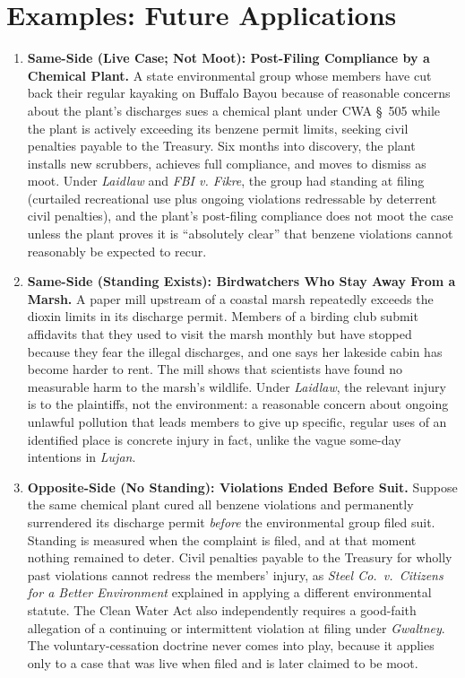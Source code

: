\documentclass[12pt]{article}
\begin{document}
\section{Examples: Future Applications}
\begin{enumerate}

\item \textbf{Same-Side (Live Case; Not Moot): Post-Filing Compliance by a Chemical Plant.} A state environmental group whose members have cut back their regular kayaking on Buffalo Bayou because of reasonable concerns about the plant's discharges sues a chemical plant under CWA \S~505 while the plant is actively exceeding its benzene permit limits, seeking civil penalties payable to the Treasury. Six months into discovery, the plant installs new scrubbers, achieves full compliance, and moves to dismiss as moot. Under \textit{Laidlaw} and \textit{FBI v. Fikre}, the group had standing at filing (curtailed recreational use plus ongoing violations redressable by deterrent civil penalties), and the plant's post-filing compliance does not moot the case unless the plant proves it is ``absolutely clear'' that benzene violations cannot reasonably be expected to recur.

\item \textbf{Same-Side (Standing Exists): Birdwatchers Who Stay Away From a Marsh.} A paper mill upstream of a coastal marsh repeatedly exceeds the dioxin limits in its discharge permit. Members of a birding club submit affidavits that they used to visit the marsh monthly but have stopped because they fear the illegal discharges, and one says her lakeside cabin has become harder to rent. The mill shows that scientists have found no measurable harm to the marsh's wildlife. Under \textit{Laidlaw}, the relevant injury is to the plaintiffs, not the environment: a reasonable concern about ongoing unlawful pollution that leads members to give up specific, regular uses of an identified place is concrete injury in fact, unlike the vague some-day intentions in \textit{Lujan}.

\item \textbf{Opposite-Side (No Standing): Violations Ended Before Suit.} Suppose the same chemical plant cured all benzene violations and permanently surrendered its discharge permit \textit{before} the environmental group filed suit. Standing is measured when the complaint is filed, and at that moment nothing remained to deter. Civil penalties payable to the Treasury for wholly past violations cannot redress the members' injury, as \textit{Steel Co.\ v.\ Citizens for a Better Environment} explained in applying a different environmental statute. The Clean Water Act also independently requires a good-faith allegation of a continuing or intermittent violation at filing under \textit{Gwaltney}. The voluntary-cessation doctrine never comes into play, because it applies only to a case that was live when filed and is later claimed to be moot.


\end{enumerate}
\end{document}

